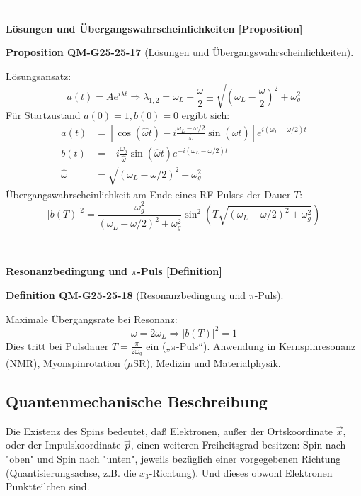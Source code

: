 \documentclass[10pt, letterpaper]{article}
\newcommand{\CustomHeading}[3]{%
  \par\medskip\noindent%
  \textbf{#1 #2} \textnormal{(#3)}.\enskip%
}
\newenvironment{DEF}[2]{\begin{unitbox}\CustomHeading{Definition}{#1}{#2}}{\end{unitbox}}
\newenvironment{PROP}[2]{\begin{unitbox}\CustomHeading{Proposition}{#1}{#2}}{\end{unitbox}}
\begin{document}
---

\textbf{Lösungen und Übergangswahrscheinlichkeiten [Proposition]}

\begin{PROP}{QM-G25-25-17}{Lösungen und Übergangswahrscheinlichkeiten}
Lösungsansatz:
\[
a(t) = A e^{i\lambda t}
\Rightarrow
\lambda_{1,2} = \omega_L - \frac{\omega}{2} \pm \sqrt{\left(\omega_L - \frac{\omega}{2}\right)^2 + \omega_g^2}
\]
Für Startzustand \( a(0)=1, b(0)=0 \) ergibt sich:
\[
\begin{aligned}
a(t) &= \left[\cos(\widehat{\omega} t) - i \frac{\omega_L - \omega/2}{\widehat{\omega}} \sin(\widehat{\omega} t) \right]
e^{i(\omega_L - \omega/2)t} \\
b(t) &= -i \frac{\omega_g}{\widehat{\omega}} \sin(\widehat{\omega} t)
e^{-i(\omega_L - \omega/2)t} \\
\widehat{\omega} &= \sqrt{(\omega_L - \omega/2)^2 + \omega_g^2}
\end{aligned}
\]
Übergangswahrscheinlichkeit am Ende eines RF-Pulses der Dauer \( T \):
\[
|b(T)|^2 =
\frac{\omega_g^2}{(\omega_L - \omega/2)^2 + \omega_g^2}
\sin^2\left(T \sqrt{(\omega_L - \omega/2)^2 + \omega_g^2} \right)
\]
\end{PROP}

---

\textbf{Resonanzbedingung und $\pi$-Puls [Definition]}

\begin{DEF}{QM-G25-25-18}{Resonanzbedingung und $\pi$-Puls}
Maximale Übergangsrate bei Resonanz:
\[
\omega = 2 \omega_L \Rightarrow |b(T)|^2 = 1
\]
Dies tritt bei Pulsdauer \( T = \frac{\pi}{2 \omega_g} \) ein („$\pi$-Puls“). Anwendung in Kernspinresonanz (NMR), Myonspinrotation ($\mu$SR), Medizin und Materialphysik.
\end{DEF}




\pagebreak




\subsection*{Quantenmechanische Beschreibung}


Die Existenz des Spins bedeutet, daß Elektronen, außer der Ortskoordinate $\vec{x}$, oder der Impulskoordinate $\vec{p}$, einen weiteren Freiheitsgrad besitzen: Spin nach "oben" und Spin nach "unten", jeweils bezüglich einer vorgegebenen Richtung (Quantisierungsachse, z.B. die $x_{3}$-Richtung). Und dieses obwohl Elektronen Punktteilchen sind.
\end{document}
